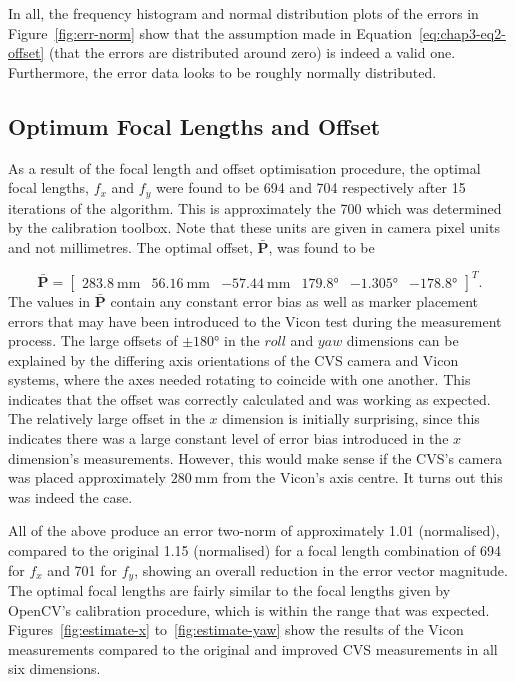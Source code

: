 In all, the frequency histogram and normal distribution plots of the errors in Figure~\ref{fig:err-norm} show that the assumption made in Equation~\ref{eq:chap3-eq2-offset} (that the errors are distributed around zero) is indeed a valid one. Furthermore, the error data looks to be roughly normally distributed. 

\subsection{Optimum Focal Lengths and Offset}

As a result of the focal length and offset optimisation procedure, the optimal focal lengths, $f_x$ and $f_y$ were found to be 694 and 704 respectively after 15 iterations of the algorithm. This is approximately the 700 which was determined by the calibration toolbox. Note that these units are given in camera pixel units and not millimetres. The optimal offset, $\bar{\bm{P}}$, was found to be 

\begin{equation}
  \label{eq:chap3-offset-value}
  \bar{\bm{P}} = 
  \begin{bmatrix}
    \SI{283.8}{\mm} & \SI{56.16}{\mm} & \SI{-57.44}{\mm} & \ang{179.8} & \ang{-1.305} & \ang{-178.8}
  \end{bmatrix}^T.
\end{equation}
The values in $\bar{\bm{P}}$ contain any constant error bias as well as marker placement errors that may have been introduced to the Vicon test during the measurement process. The large offsets of $\pm\ang{180}$ in the $roll$ and $yaw$ dimensions can be explained by the differing axis orientations of the CVS camera and Vicon systems, where the axes needed rotating to coincide with one another. This indicates that the offset was correctly calculated and was working as expected. The relatively large offset in the $x$ dimension is initially surprising, since this indicates there was a large constant level of error bias introduced in the $x$ dimension's measurements. However, this would make sense if the CVS's camera was placed approximately $\SI{280}{\mm}$ from the Vicon's axis centre. It turns out this was indeed the case. 

All of the above produce an error two-norm of approximately 1.01 (normalised), compared to the original 1.15 (normalised) for a focal length combination of 694 for $f_x$ and 701 for $f_y$, showing an overall reduction in the error vector magnitude. The optimal focal lengths are fairly similar to the focal lengths given by OpenCV's calibration procedure, which is within the range that was expected. Figures~\ref{fig:estimate-x} to~\ref{fig:estimate-yaw} show the results of the Vicon measurements compared to the original and improved CVS measurements in all six dimensions.

